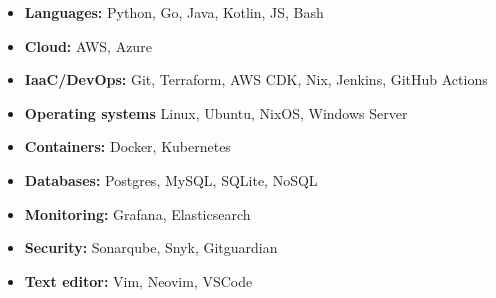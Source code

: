 \begin{itemize}[leftmargin=1.2em, itemsep=2pt]
	\item \textbf{Languages:} Python, Go, Java, Kotlin, JS, Bash
	\item \textbf{Cloud:} AWS, Azure
	\item \textbf{IaaC/DevOps:} Git, Terraform, AWS CDK, Nix, Jenkins, GitHub Actions
	\item \textbf{Operating systems} Linux, Ubuntu, NixOS, Windows Server
	\item \textbf{Containers:} Docker, Kubernetes
	\item \textbf{Databases:} Postgres, MySQL, SQLite, NoSQL
	\item \textbf{Monitoring:} Grafana, Elasticsearch
	\item \textbf{Security:} Sonarqube, Snyk, Gitguardian
	\item \textbf{Text editor:} Vim, Neovim, VSCode
\end{itemize}
